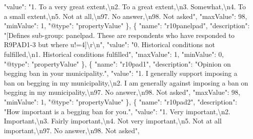 \documentclass[
]{book}
\newenvironment{Shaded}{\begin{snugshade}}{\end{snugshade}}
\newcommand{\CharTok}[1]{\textcolor[rgb]{0.31,0.60,0.02}{#1}}
\newcommand{\DataTypeTok}[1]{\textcolor[rgb]{0.13,0.29,0.53}{#1}}
\newcommand{\DecValTok}[1]{\textcolor[rgb]{0.00,0.00,0.81}{#1}}
\newcommand{\FunctionTok}[1]{\textcolor[rgb]{0.00,0.00,0.00}{#1}}
\newcommand{\OtherTok}[1]{\textcolor[rgb]{0.56,0.35,0.01}{#1}}
\newcommand{\StringTok}[1]{\textcolor[rgb]{0.31,0.60,0.02}{#1}}
\begin{document}
\begin{Shaded}
\begin{Highlighting}[]
      \DataTypeTok{"value"}\FunctionTok{:} \StringTok{"1. To a very great extent,}\CharTok{\textbackslash{}n}\StringTok{2. To a great extent,}\CharTok{\textbackslash{}n}\StringTok{3. Somewhat,}\CharTok{\textbackslash{}n}\StringTok{4. To a small extent,}\CharTok{\textbackslash{}n}\StringTok{5. Not at all,}\CharTok{\textbackslash{}n}\StringTok{97. No answer,}\CharTok{\textbackslash{}n}\StringTok{98. Not asked"}\FunctionTok{,}
      \DataTypeTok{"maxValue"}\FunctionTok{:} \DecValTok{98}\FunctionTok{,}
      \DataTypeTok{"minValue"}\FunctionTok{:} \DecValTok{1}\FunctionTok{,}
      \DataTypeTok{"@type"}\FunctionTok{:} \StringTok{"propertyValue"}
    \FunctionTok{\}}\OtherTok{,}
    \FunctionTok{\{}
      \DataTypeTok{"name"}\FunctionTok{:} \StringTok{"r10panelpad"}\FunctionTok{,}
      \DataTypeTok{"description"}\FunctionTok{:} \StringTok{"[Defines sub-group: panelpad. These are respondents who have responded to R9PAD1-3 but where u!=4]}\CharTok{\textbackslash{}r\textbackslash{}n}\StringTok{"}\FunctionTok{,}
      \DataTypeTok{"value"}\FunctionTok{:} \StringTok{"0. Historical conditions not fulfilled,}\CharTok{\textbackslash{}n}\StringTok{1. Historical conditions fulfilled"}\FunctionTok{,}
      \DataTypeTok{"maxValue"}\FunctionTok{:} \DecValTok{1}\FunctionTok{,}
      \DataTypeTok{"minValue"}\FunctionTok{:} \DecValTok{0}\FunctionTok{,}
      \DataTypeTok{"@type"}\FunctionTok{:} \StringTok{"propertyValue"}
    \FunctionTok{\}}\OtherTok{,}
    \FunctionTok{\{}
      \DataTypeTok{"name"}\FunctionTok{:} \StringTok{"r10pad1"}\FunctionTok{,}
      \DataTypeTok{"description"}\FunctionTok{:} \StringTok{"Opinion on begging ban in your municipality."}\FunctionTok{,}
      \DataTypeTok{"value"}\FunctionTok{:} \StringTok{"1. I generally support imposing a ban on begging in my municipality,}\CharTok{\textbackslash{}n}\StringTok{2. I am generally against imposing a ban on begging in my municipality,}\CharTok{\textbackslash{}n}\StringTok{97. No answer,}\CharTok{\textbackslash{}n}\StringTok{98. Not asked"}\FunctionTok{,}
      \DataTypeTok{"maxValue"}\FunctionTok{:} \DecValTok{98}\FunctionTok{,}
      \DataTypeTok{"minValue"}\FunctionTok{:} \DecValTok{1}\FunctionTok{,}
      \DataTypeTok{"@type"}\FunctionTok{:} \StringTok{"propertyValue"}
    \FunctionTok{\}}\OtherTok{,}
    \FunctionTok{\{}
      \DataTypeTok{"name"}\FunctionTok{:} \StringTok{"r10pad2"}\FunctionTok{,}
      \DataTypeTok{"description"}\FunctionTok{:} \StringTok{"How important is a begging ban for you."}\FunctionTok{,}
      \DataTypeTok{"value"}\FunctionTok{:} \StringTok{"1. Very important,}\CharTok{\textbackslash{}n}\StringTok{2. Important,}\CharTok{\textbackslash{}n}\StringTok{3. Fairly important,}\CharTok{\textbackslash{}n}\StringTok{4. Not very important,}\CharTok{\textbackslash{}n}\StringTok{5. Not at all important,}\CharTok{\textbackslash{}n}\StringTok{97. No answer,}\CharTok{\textbackslash{}n}\StringTok{98. Not asked"}\FunctionTok{,}

\end{Highlighting}
\end{Shaded}
\end{document}
